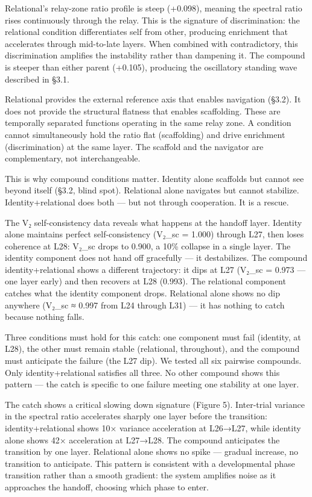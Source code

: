 \documentclass[12pt]{article}
\begin{document}
Relational's relay-zone ratio profile is steep (+0.098), meaning the spectral ratio rises continuously through the relay. This is the signature of discrimination: the relational condition differentiates self from other, producing enrichment that accelerates through mid-to-late layers. When combined with contradictory, this discrimination amplifies the instability rather than dampening it. The compound is steeper than either parent (+0.105), producing the oscillatory standing wave described in §3.1.

Relational provides the external reference axis that enables navigation (§3.2). It does not provide the structural flatness that enables scaffolding. These are temporally separated functions operating in the same relay zone. A condition cannot simultaneously hold the ratio flat (scaffolding) and drive enrichment (discrimination) at the same layer. The scaffold and the navigator are complementary, not interchangeable.

This is why compound conditions matter. Identity alone scaffolds but cannot see beyond itself (§3.2, blind spot). Relational alone navigates but cannot stabilize. Identity+relational does both — but not through cooperation. It is a rescue.

The V₂ self-consistency data reveals what happens at the handoff layer. Identity alone maintains perfect self-consistency (V₂\_sc = 1.000) through L27, then loses coherence at L28: V₂\_sc drops to 0.900, a 10\% collapse in a single layer. The identity component does not hand off gracefully — it destabilizes. The compound identity+relational shows a different trajectory: it dips at L27 (V₂\_sc = 0.973 — one layer early) and then recovers at L28 (0.993). The relational component catches what the identity component drops. Relational alone shows no dip anywhere (V₂\_sc ≈ 0.997 from L24 through L31) — it has nothing to catch because nothing falls.

Three conditions must hold for this catch: one component must fail (identity, at L28), the other must remain stable (relational, throughout), and the compound must anticipate the failure (the L27 dip). We tested all six pairwise compounds. Only identity+relational satisfies all three. No other compound shows this pattern — the catch is specific to one failure meeting one stability at one layer.

The catch shows a critical slowing down signature (Figure 5). Inter-trial variance in the spectral ratio accelerates sharply one layer before the transition: identity+relational shows 10× variance acceleration at L26→L27, while identity alone shows 42× acceleration at L27→L28. The compound anticipates the transition by one layer. Relational alone shows no spike — gradual increase, no transition to anticipate. This pattern is consistent with a developmental phase transition rather than a smooth gradient: the system amplifies noise as it approaches the handoff, choosing which phase to enter.
\end{document}
